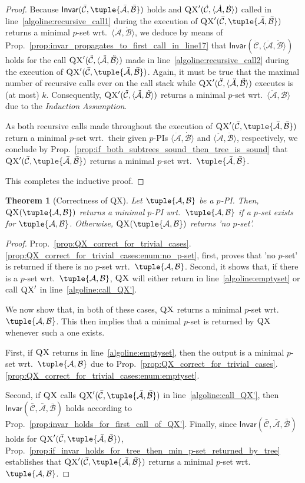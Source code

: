 \documentclass[]{elsarticle}
\newcommand{\scQX}{{\textsc{QX}}}
\newcommand{\ma}{\mathcal{A}}
\newcommand{\mb}{\mathcal{B}}
\newcommand{\mc}{\mathcal{C}}
\newcommand{\ba}{\bar{\ma}}
\newcommand{\bb}{\bar{\mb}}
\newcommand{\bc}{\bar{\mc}}
\newcommand{\Inv}{\mathsf{Invar}}
\newcommand{\ddmb}{\ddot{\mb}}
\newcommand{\ddma}{\ddot{\ma}}
\newcommand{\ddmc}{\ddot{\mc}}
\newcommand{\dmb}{\dot{\mb}}
\newcommand{\dma}{\dot{\ma}}
\newcommand{\dmc}{\dot{\mc}}
\newtheorem{theorem}{Theorem}[]{}
\begin{document}
\begin{proof}
		Because $\Inv(\bc,\tuple{\ba,\bb})$ holds and $\scQX'(\dmc,\langle\dma,\dmb\rangle)$ called in line~\ref{algoline:recursive_call1} during the execution of $\scQX'(\bc,\tuple{\ba,\bb})$ returns a minimal $p$-set wrt.\ $\langle\dma,\dmb\rangle$, we deduce by means of Prop.~\ref{prop:invar_propagates_to_first_call_in_line17} that $\Inv(\ddmc,\langle\ddma,\ddmb\rangle)$ holds for the call $\scQX'(\ddmc,\langle\ddma,\ddmb\rangle)$ made in line~\ref{algoline:recursive_call2} during the execution of $\scQX'(\bc,\tuple{\ba,\bb})$. Again, it must be true that the maximal number of recursive calls ever on the call stack while $\scQX'(\ddmc,\langle\ddma,\ddmb\rangle)$ executes is (at most) $k$. Consequently, $\scQX'(\ddmc,\langle\ddma,\ddmb\rangle)$ returns a minimal $p$-set wrt.\ $\langle\ddma,\ddmb\rangle$ due to the \emph{Induction Assumption}.
		
		As both recursive calls made throughout the execution of $\scQX'(\bc,\tuple{\ba,\bb})$ return a minimal $p$-set wrt.\ their given $p$-PIs $\langle\dma,\dmb\rangle$ and $\langle\ddma,\ddmb\rangle$, respectively, we conclude by Prop.~\ref{prop:if_both_subtrees_sound_then_tree_is_sound} that $\scQX'(\bc,\tuple{\ba,\bb})$ returns a minimal $p$-set wrt.\ $\tuple{\ba,\bb}$.
		
		This completes the inductive proof.
	\end{proof}
	\begin{theorem}[Correctness of QX]
		Let $\tuple{\ma,\mb}$ be a $p$-PI. Then, $\scQX(\tuple{\ma,\mb})$ returns a minimal $p$-PI wrt.\ $\tuple{\ma,\mb}$ if a $p$-set exists for $\tuple{\ma,\mb}$. Otherwise, $\scQX(\tuple{\ma,\mb})$ returns 'no $p$-set'. 
	\end{theorem}
	\begin{proof}
		Prop.~\ref{prop:QX_correct_for_trivial_cases}.\ref{prop:QX_correct_for_trivial_cases:enum:no_p-set}, first, proves that 'no $p$-set' is returned if there is no $p$-set wrt.\ $\tuple{\ma,\mb}$. Second, it shows that, if there is a $p$-set wrt.\ $\tuple{\ma,\mb}$, $\scQX$ will either return in line~\ref{algoline:emptyset} or call $\scQX'$ in line~\ref{algoline:call_QX'}. 
		
		We now show that, in both of these cases, $\scQX$ returns a minimal $p$-set wrt.\ $\tuple{\ma,\mb}$. This then implies that a minimal $p$-set is returned by $\scQX$ whenever such a one exists.
		
		First, if $\scQX$ returns in line~\ref{algoline:emptyset}, then the output is a minimal $p$-set wrt.\ $\tuple{\ma,\mb}$ due to Prop.~\ref{prop:QX_correct_for_trivial_cases}.\ref{prop:QX_correct_for_trivial_cases:enum:emptyset}. 
		
		Second, if $\scQX$ calls $\scQX'(\bc,\tuple{\ba,\bb})$ in line~\ref{algoline:call_QX'}, then $\Inv(\bc,\ba,\bb)$ holds according to Prop.~\ref{prop:invar_holds_for_first_call_of_QX'}. Finally, since $\Inv(\bc,\ba,\bb)$ holds for $\scQX'(\bc,\tuple{\ba,\bb})$, Prop.~\ref{prop:if_invar_holds_for_tree_then_min_p-set_returned_by_tree} establishes that $\scQX'(\bc,\tuple{\ba,\bb})$ returns a minimal $p$-set wrt.\ $\tuple{\ma,\mb}$.   
	\end{proof}
	
\end{document}
